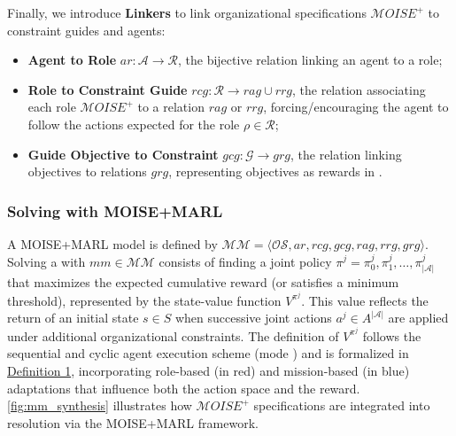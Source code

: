 \noindent Finally, we introduce \textbf{Linkers} to link organizational specifications $\mathcal{M}OISE^+$ to constraint guides and agents:
%
\begin{itemize}

  \item \textbf{Agent to Role} \quad $ar: \mathcal{A} \to \mathcal{R}$, the bijective relation linking an agent to a role;
  \item \textbf{Role to Constraint Guide} \quad $rcg: \mathcal{R} \rightarrow rag \cup rrg$, the relation associating each role $\mathcal{M} OISE^+$ to a relation $rag$ or $rrg$, forcing/encouraging the agent to follow the actions expected for the role $\rho \in \mathcal{R}$;
  \item \textbf{Guide Objective to Constraint} \quad $gcg: \mathcal {G} \rightarrow grg$, the relation linking objectives to relations $grg$, representing objectives as rewards in .
\end{itemize}

\subsubsection*{Solving  with MOISE+MARL}

A MOISE+MARL model is defined by $\mathcal{MM} = \langle \mathcal{OS}, ar, rcg, gcg, rag, rrg, grg \rangle$.
Solving a  with $mm \in \mathcal{MM}$ consists of finding a joint policy $\pi^j = {\pi^j_0, \pi^j_1, \dots, \pi^j_{|\mathcal {A}|}}$ that maximizes the expected cumulative reward (or satisfies a minimum threshold), represented by the state-value function $V^{\pi^j}$. This value reflects the return of an initial state $s \in S$ when successive joint actions $a^j \in A^{|\mathcal{A}|}$ are applied under additional organizational constraints.
%
The definition of $V^{\pi^j}$ follows the sequential and cyclic agent execution scheme (mode ) and is formalized in \hyperref[eq:single_value_function]{Definition 1}, incorporating role-based (in red) and mission-based (in blue) adaptations that influence both the action space and the reward.
\autoref{fig:mm_synthesis} illustrates how $\mathcal{M}OISE^+$ specifications are integrated into  resolution via the MOISE+MARL framework.


